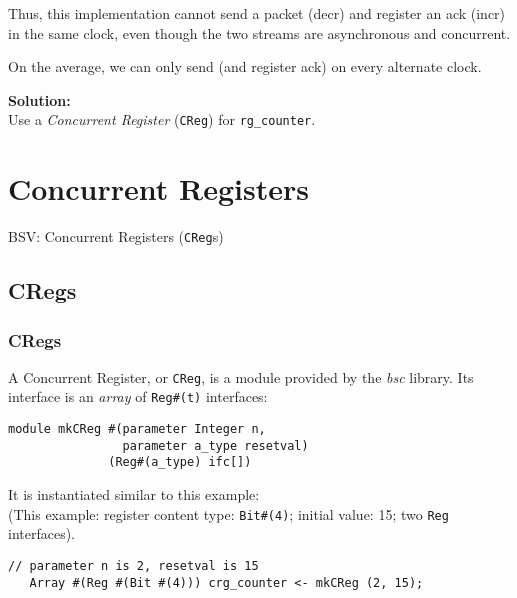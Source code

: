 \begin{frame}[fragile]
\begin{minipage}{0.5\textwidth}
{\scriptsize
Thus, this implementation cannot send a packet (decr) and
register an ack (incr) in the same clock, even though the two streams
are asynchronous and concurrent.}

\vspace{1ex}

{\scriptsize
On the average, we can only send (and register ack) on every alternate clock.}

\vspace{3ex}

{\bf Solution:} \\
Use a \emph{Concurrent Register} ({\tt CReg}) for {\tt rg\_counter}.

\end{minipage}

\end{frame}


\section{Concurrent Registers}

\begin{frame}

\begin{center}
  {\LARGE BSV: Concurrent Registers ({\tt CReg}s)}
\end{center}

\end{frame}


\subsection{CRegs}

\begin{frame}[fragile]
\frametitle{CRegs}

\footnotesize

A Concurrent Register, or \verb|CReg|, is a module provided by
 the \emph{bsc} library.  Its interface is an \emph{array}
 of \verb|Reg#(t)| interfaces:

\begin{Verbatim}[frame=single]
module mkCReg #(parameter Integer n,
                parameter a_type resetval)
              (Reg#(a_type) ifc[])
\end{Verbatim}

\vspace{5ex}

It is instantiated similar to this example: \\
(This example: register content type: \verb|Bit#(4)|; initial value: 15; two {\tt Reg} interfaces).

\begin{Verbatim}[frame=single]
   // parameter n is 2, resetval is 15
   Array #(Reg #(Bit #(4))) crg_counter <- mkCReg (2, 15);
\end{Verbatim}

\end{frame}

